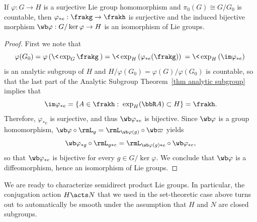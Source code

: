 \begin{thm}\label{thm 11.1.8 HN}
    If $\varphi:G\to H$ is a surjective Lie group homomorphism and $\pi_0(G)\cong G\slash G_0$ is countable, then $\varphi_{\ast e}:\frakg\to\frakh$ is surjective and the induced bijective morphism $\wb\varphi:G\slash\ker\varphi\to H$ is an isomorphism of Lie groups.
\end{thm}
\begin{proof}
    First we note that 
    \[\varphi(G_0)=\varphi\left(\<\exp_G \frakg\>\right)=\<\exp_H\left(\varphi_{\ast e}(\frakg)\right)\> =\<\exp_H\left(\im\varphi_{\ast e}\right)\>\]
    is an analytic subgroup of $H$ and $H\slash\varphi(G_0)=\varphi(G)\slash \varphi(G_0)$ is countable, so that the last part of the Analytic Subgroup Theorem~\ref{thm analytic subgroup} implies that 
    \[\im\varphi_{\ast e}=\{A\in\frakh:\; \exp_H(\bbR A)\subset H\}=\frakh.\]
    Therefore, $\varphi_{\ast e}$ is surjective, and thus $\wb\varphi_{\ast e}$ is bijective. Since $\wb\varphi$ is a group homomorphism, $\wb\varphi\circ\rmL_g=\rmL_{\wb\varphi(g)}\circ\wb\varpi$ yields 
    \[\wb\varphi_{\ast g}\circ \rmL_{g\ast e}=\rmL_{\wb\varphi(g)\ast e}\circ\wb\varphi_{\ast e},\]
    so that $\wb\varphi_{\ast e}$ is bijective for every $g\in G\slash \ker\varphi$. We conclude that $\wb\varphi$ is a diffeomorphism, hence an isomorphism of Lie groups.
\end{proof}

We are ready to characterize semidirect product Lie groups. In particular, the conjugation action $H\acts N$ that we used in the set-theoretic case above turns out to automatically be smooth under the assumption that $H$ and $N$ are closed subgroups.

